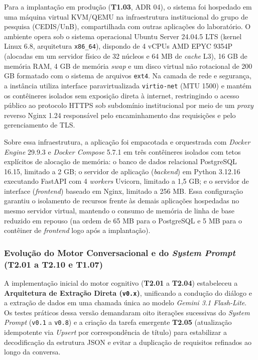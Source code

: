Para a implantação em produção (\textbf{T1.03}, ADR 04), o sistema foi hospedado em uma máquina virtual KVM/QEMU na infraestrutura institucional do grupo de pesquisa (CEDIS/UnB), compartilhada com outras aplicações do laboratório. O ambiente opera sob o sistema operacional Ubuntu Server 24.04.5 LTS (kernel Linux 6.8, arquitetura \texttt{x86\_64}), dispondo de 4 vCPUs AMD EPYC 9354P (alocadas em um servidor físico de 32 núcleos e 64 MB de \textit{cache} L3), 16 GB de memória RAM, 4 GB de memória \textit{swap} e um disco virtual não rotacional de 200 GB formatado com o sistema de arquivos \texttt{ext4}. Na camada de rede e segurança, a instância utiliza interface paravirtualizada \texttt{virtio-net} (MTU 1500) e mantém os contêineres isolados sem exposição direta à internet, restringindo o acesso público ao protocolo HTTPS sob subdomínio institucional por meio de um \textit{proxy} reverso Nginx 1.24 responsável pelo encaminhamento das requisições e pelo gerenciamento de TLS.

Sobre essa infraestrutura, a aplicação foi empacotada e orquestrada com \textit{Docker Engine} 29.9.3 e \textit{Docker Compose} 5.7.1 em três contêineres isolados com tetos explícitos de alocação de memória: o banco de dados relacional PostgreSQL 16.15, limitado a 2 GB; o servidor de aplicação (\textit{backend}) em Python 3.12.16 executando FastAPI com 4 \textit{workers} Uvicorn, limitado a 1,5 GB; e o servidor de interface (\textit{frontend}) baseado em Nginx, limitado a 256 MB. Essa configuração garantiu o isolamento de recursos frente às demais aplicações hospedadas no mesmo servidor virtual, mantendo o consumo de memória de linha de base reduzido em repouso (na ordem de 65 MB para o PostgreSQL e 5 MB para o contêiner de \textit{frontend} logo após a implantação).

\subsubsection*{Evolução do Motor Conversacional e do \textit{System Prompt} (T2.01 a T2.10 e T1.07)}

A implementação inicial do motor cognitivo (\textbf{T2.01} a \textbf{T2.04}) estabeleceu a \textbf{Arquitetura de Extração Direta (\texttt{v0.x})}, unificando a condução do diálogo e a extração de dados em uma chamada única ao modelo \textit{Gemini 3.1 Flash-Lite}. Os testes práticos dessa versão demandaram oito iterações sucessivas do \textit{System Prompt} (\texttt{v0.1} a \texttt{v0.8}) e a criação da tarefa emergente \textbf{T2.05} (atualização idempotente via \textit{Upsert} por correspondência de título) para estabilizar a decodificação da estrutura JSON e evitar a duplicação de requisitos refinados ao longo da conversa.

